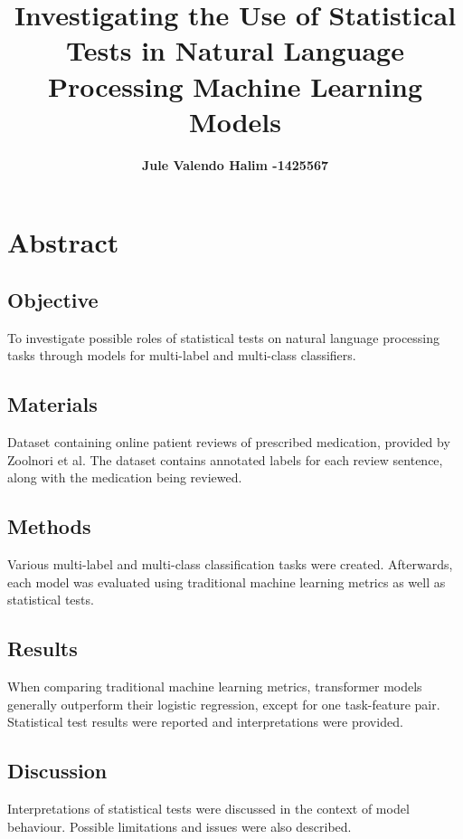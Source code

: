 \documentclass[10.7pt, onecolumn]{article}
\title{\vspace{-2em} Investigating the Use of Statistical Tests in Natural Language Processing Machine Learning Models}
\author[ ]{\bf\fontsize{13}{14}\selectfont Jule Valendo Halim -1425567\vspace{-.7em}}
\affil[ ]{\bf\fontsize{13}{14}\selectfont University of Melbourne}
\date{} %
\begin{document}
\maketitle
\vspace{-4em} %

\section{Abstract}\label{abstract}
\subsection{Objective}

To investigate possible roles of statistical tests on natural language processing tasks through models for multi-label and multi-class classifiers.
\subsection{Materials}

Dataset containing online patient reviews of prescribed medication, provided by Zoolnori et al\cite{psyTAR1}\cite{psyTar2}. The dataset contains annotated labels for each review sentence, along with the medication being reviewed.
\subsection{Methods}

Various multi-label and multi-class classification tasks were created. Afterwards, each model was evaluated using traditional machine learning metrics as well as statistical tests.

\subsection{Results}

When comparing traditional machine learning metrics, transformer models generally outperform their logistic regression, except for one task-feature pair. Statistical test results were reported and interpretations were provided.

\subsection{Discussion}

Interpretations of statistical tests were discussed in the context of model behaviour. Possible limitations and issues were also described.
\end{document}
